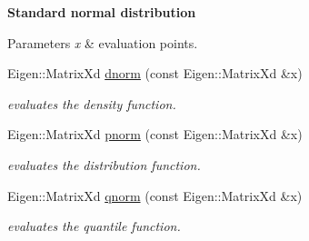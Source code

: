 \begin{Indent}{\bf Standard normal distribution}\par
{\em 
\begin{DoxyParams}{Parameters}
{\em x} & evaluation points. \\
\hline
\end{DoxyParams}
}\begin{DoxyCompactItemize}
\item 
Eigen\+::\+Matrix\+Xd \hyperlink{namespacevinecopulib_1_1tools__stats_a249880b93e82211207869f94821de440}{dnorm} (const Eigen\+::\+Matrix\+Xd \&x)\hypertarget{namespacevinecopulib_1_1tools__stats_a249880b93e82211207869f94821de440}{}\label{namespacevinecopulib_1_1tools__stats_a249880b93e82211207869f94821de440}

\begin{DoxyCompactList}\small\item\em evaluates the density function. \end{DoxyCompactList}\item 
Eigen\+::\+Matrix\+Xd \hyperlink{namespacevinecopulib_1_1tools__stats_aa380a12540c4749e14049cdd0b163352}{pnorm} (const Eigen\+::\+Matrix\+Xd \&x)\hypertarget{namespacevinecopulib_1_1tools__stats_aa380a12540c4749e14049cdd0b163352}{}\label{namespacevinecopulib_1_1tools__stats_aa380a12540c4749e14049cdd0b163352}

\begin{DoxyCompactList}\small\item\em evaluates the distribution function. \end{DoxyCompactList}\item 
Eigen\+::\+Matrix\+Xd \hyperlink{namespacevinecopulib_1_1tools__stats_a4772a68417aa49b50e69c957db8533f7}{qnorm} (const Eigen\+::\+Matrix\+Xd \&x)\hypertarget{namespacevinecopulib_1_1tools__stats_a4772a68417aa49b50e69c957db8533f7}{}\label{namespacevinecopulib_1_1tools__stats_a4772a68417aa49b50e69c957db8533f7}

\begin{DoxyCompactList}\small\item\em evaluates the quantile function. \end{DoxyCompactList}\end{DoxyCompactItemize}
\end{Indent}
